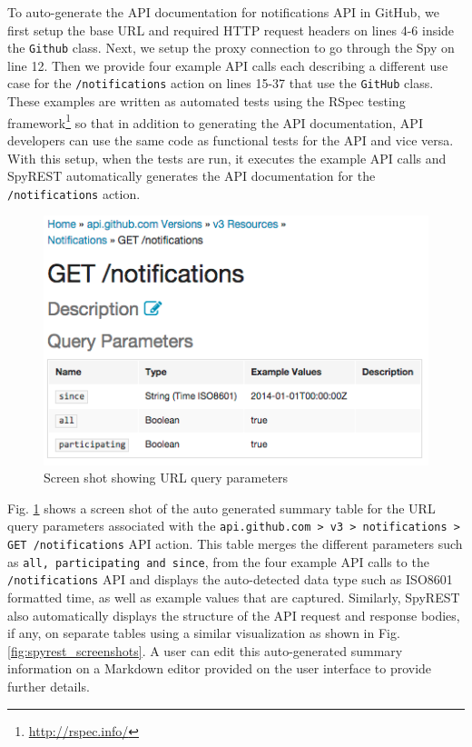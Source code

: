 \documentclass[conference]{IEEEtran}
\begin{document}
To auto-generate the API documentation for notifications API in GitHub, we first setup the base URL and required HTTP request headers on lines 4-6 inside the \texttt{Github} class. Next, we setup the proxy connection to go through the Spy on line 12. Then we provide four example API calls each describing a different use case for the \texttt{/notifications} action on lines 15-37 that use the \texttt{GitHub} class. These examples are written as automated tests using the RSpec testing framework\footnote{\url{http://rspec.info/}} so that in addition to generating the API documentation, API developers can use the same code as functional tests for the API and vice versa. With this setup, when the tests are run, it executes the example API calls and SpyREST automatically generates the API documentation for the \texttt{/notifications} action.


\begin{figure}[!tbh]
  \centering
  \includegraphics[width=\linewidth]{notifications_query.png}
  \caption{Screen shot showing URL query parameters}
  \label{fig:notifications_query}
\end{figure}

Fig. \ref{fig:notifications_query} shows a screen shot of the auto generated summary table for the URL query parameters associated with the \texttt{api.github.com > v3 > notifications > GET /notifications} API action. This table merges the different parameters such as \texttt{all, participating and since}, from the four example API calls to the \texttt{/notifications} API and displays the auto-detected data type such as ISO8601 formatted time, as well as example values that are captured. Similarly, SpyREST also automatically displays the structure of the API request and response bodies, if any, on separate tables using a similar visualization as shown in Fig. \ref{fig:spyrest_screenshots}. A user can edit this auto-generated summary information on a Markdown editor provided on the user interface to provide further details.
\end{document}
